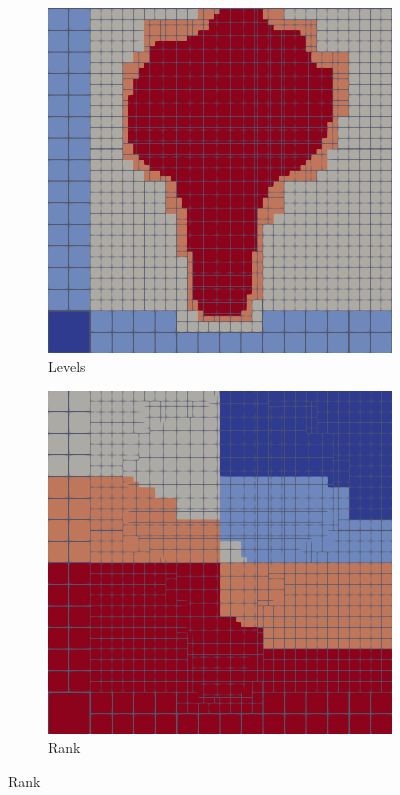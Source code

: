 \documentclass[12pt,letterpaper]{article}
\begin{document}
\begin{figure}[ht]
\centering
\caption{Quadtree}
\label{quadtree}
\begin{subfigure}[b]{0.4\textwidth}
\caption{Levels}
\label{quad_levels}
\includegraphics[width=\textwidth]{quad_level.png}
\end{subfigure}
\begin{subfigure}[b]{0.4\textwidth}
\caption{Rank}
\label{quad_rank}
\includegraphics[width=\textwidth]{quad_rank.png}
\end{subfigure}
\end{figure}
\end{document}
